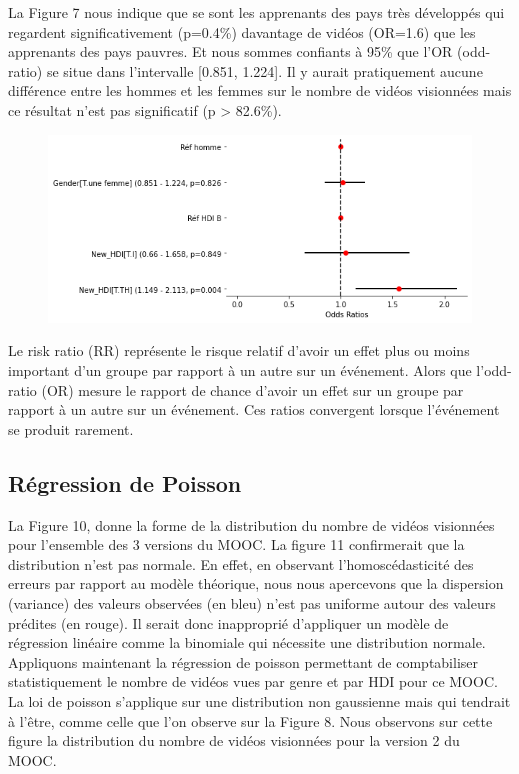 \documentclass[12pt, a4paper, titlepage, table]{article}
\begin{document}
La Figure 7 nous indique que se sont les apprenants des pays très développés qui regardent significativement (p=0.4\%) davantage de vidéos (OR=1.6) que les apprenants des pays pauvres.  Et nous sommes confiants à 95\% que l'OR (odd-ratio) se situe dans l'intervalle [0.851, 1.224].   
Il y aurait pratiquement aucune différence entre les hommes et les femmes sur le nombre de vidéos visionnées mais ce résultat n'est pas significatif (p > 82.6\%).

\begin{figure}[H]
	\centering
	\includegraphics[width=1\textwidth]{../../graph/forestplot_V2_binomiale.png}
\end{figure}

Le risk ratio (RR) représente le risque relatif d'avoir un effet plus ou moins important d'un groupe par rapport à un autre sur un événement. Alors que l'odd-ratio (OR) mesure le rapport de chance d'avoir un effet sur un groupe par rapport à un autre sur un événement. Ces ratios convergent lorsque l'événement se produit rarement.


\subsection{Régression de Poisson}
La Figure 10, donne la forme de la distribution du nombre de vidéos visionnées pour l'ensemble des 3 versions du MOOC.
La figure 11 confirmerait que la distribution n'est pas normale. En effet, en observant l'homoscédasticité des erreurs par 
rapport au modèle théorique, nous nous apercevons que la dispersion (variance) des valeurs observées (en bleu)
n'est pas uniforme autour des valeurs prédites (en rouge). 
Il serait donc inapproprié d'appliquer un modèle de régression linéaire comme la binomiale qui nécessite une distribution normale.
Appliquons maintenant la régression de poisson permettant de comptabiliser statistiquement le nombre de vidéos vues par
genre et par HDI pour ce MOOC. La loi de poisson s'applique sur une distribution non gaussienne mais qui tendrait à l'être, comme celle que l'on observe sur la Figure 8. Nous observons sur cette figure la distribution du nombre de vidéos visionnées pour la version 2 du MOOC.
\end{document}
